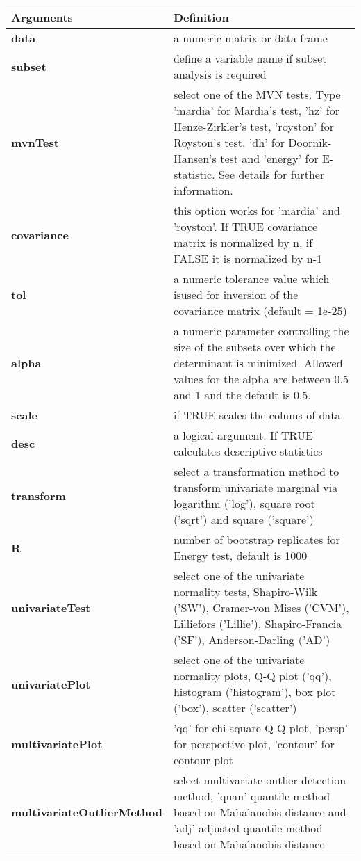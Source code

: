 \documentclass[11pt]{article}
\begin{document}
\begin{Schunk}
\begin{Soutput}
\begin{table}[H]
\centering{}
\begin{table}[H]
\centering
\begin{tabular}{>{\bfseries\leavevmode\color{black}}l>{\raggedright\arraybackslash}p{30em}}
\hiderowcolors
\toprule
Arguments & Definition\\
\midrule
\showrowcolors
data & a numeric matrix or data frame\\
subset & define a variable name if subset analysis is required\\
mvnTest & select one of the MVN tests. Type 'mardia' for Mardia's test, 'hz' for Henze-Zirkler's test, 'royston' for Royston's test, 'dh' for Doornik-Hansen's test and 'energy' for E-statistic. See details for further information.\\
covariance & this option works for 'mardia' and 'royston'. If TRUE covariance matrix is normalized by n, if FALSE it is normalized by n-1\\
tol & a numeric tolerance value which isused for inversion of the covariance matrix (default = 1e-25)\\
\addlinespace
alpha & a numeric parameter controlling the size of the subsets over which the determinant is minimized. Allowed values for the alpha are between 0.5 and 1 and the default is 0.5.\\
scale & if TRUE scales the colums of data\\
desc & a logical argument. If TRUE calculates descriptive statistics\\
transform & select a transformation method to transform univariate marginal via logarithm ('log'), square root ('sqrt') and square ('square')\\
R & number of bootstrap replicates for Energy test, default is 1000\\
\addlinespace
univariateTest & select one of the univariate normality tests, Shapiro-Wilk ('SW'), Cramer-von Mises ('CVM'), Lilliefors ('Lillie'), Shapiro-Francia ('SF'), Anderson-Darling ('AD')\\
univariatePlot & select one of the univariate normality plots, Q-Q plot ('qq'), histogram ('histogram'), box plot ('box'), scatter ('scatter')\\
multivariatePlot & 'qq' for chi-square Q-Q plot, 'persp' for perspective plot, 'contour' for contour plot\\
multivariateOutlierMethod & select multivariate outlier detection method, 'quan' quantile method based on Mahalanobis distance and 'adj' adjusted quantile method based on Mahalanobis distance\\

\end{tabular}
\end{table}
\end{table}
\end{Soutput}
\end{Schunk}
\end{document}
